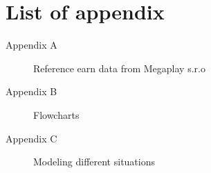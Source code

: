 
\chapter*{List of appendix}

\begin{description}
	\item[Appendix A] Reference earn data from Megaplay s.r.o
	\item[Appendix B] Flowcharts
	\item[Appendix C] Modeling different situations
\end{description}
